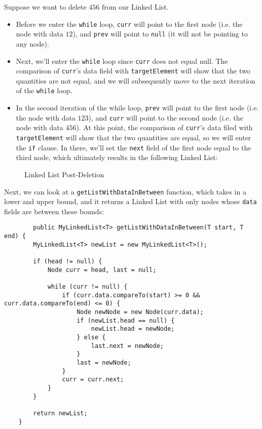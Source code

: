 Suppose we want to delete $456$ from our Linked List.
\begin{itemize}
    \item Before we enter the \verb!while! loop, \verb!curr! will point to the first node (i.e. the node with data $12$), and \verb!prev! will point to \verb!null! (it will not be pointing to any node). 
    \item Next, we'll enter the \verb!while! loop since \verb!curr! does not equal null. The comparison of \verb!curr!'s data field with \verb!targetElement! will show that the two quantities are not equal, and we will subsequently move to the next iteration of the \verb!while! loop.
    \item In the second iteration of the while loop, \verb!prev! will point to the first node (i.e. the node with data $123$), and \verb!curr! will point to the second node (i.e. the node with data $456$). At this point, the comparison of \verb!curr!'s data filed with \verb!targetElement! will show that the two quantities are equal, so we will enter the \verb!if! clause. In there, we'll set the \verb!next! field of the first node equal to the third node, which ultimately results in the following Linked List: 
\end{itemize}

\begin{figure}[h]
\centering
{}
\caption{Linked List Post-Deletion}
\end{figure}

Next, we can look at a \verb!getListWithDataInBetween! function, which takes in a lower and upper bound, and it returns a Linked List with only nodes whose \verb!data! fields are between these bounds:

\begin{lstlisting}
    	public MyLinkedList<T> getListWithDataInBetween(T start, T end) {
		MyLinkedList<T> newList = new MyLinkedList<T>();

		if (head != null) {
			Node curr = head, last = null;

			while (curr != null) {
				if (curr.data.compareTo(start) >= 0 && curr.data.compareTo(end) <= 0) {
					Node newNode = new Node(curr.data);
					if (newList.head == null) {
						newList.head = newNode;
					} else {
						last.next = newNode;
					}
					last = newNode;
				}
				curr = curr.next;
			}
		}

		return newList;
	}
\end{lstlisting}

